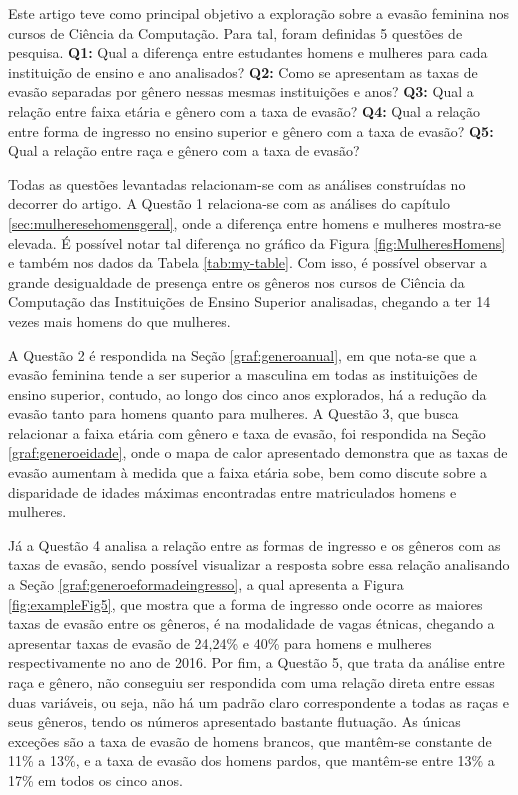 \documentclass[a4paper]{article}
\begin{document}
Este artigo teve como principal objetivo a exploração sobre a evasão feminina nos cursos de Ciência da Computação. Para tal, foram definidas 5 questões de pesquisa. \textbf{Q1:} Qual a diferença entre estudantes homens e mulheres para cada instituição de ensino e ano analisados? \textbf{Q2:} Como se apresentam as taxas de evasão separadas por gênero nessas mesmas instituições e anos? \textbf{Q3:} Qual a relação entre faixa etária e gênero com a taxa de evasão? \textbf{Q4:} Qual a relação entre forma de ingresso no ensino superior e gênero com a taxa de evasão? \textbf{Q5:} Qual a relação entre raça e gênero com a taxa de evasão?

Todas as questões levantadas relacionam-se com as análises construídas no decorrer do artigo. A Questão 1 relaciona-se com as análises do capítulo \ref{sec:mulheresehomensgeral}, onde a diferença entre homens e mulheres mostra-se elevada. É possível notar tal diferença no gráfico da Figura \ref{fig:MulheresHomens} e também nos dados da Tabela \ref{tab:my-table}. Com isso, é possível observar a grande desigualdade de presença entre os gêneros nos cursos de Ciência da Computação das Instituições de Ensino Superior analisadas, chegando a ter 14 vezes mais homens do que mulheres.%


A Questão 2 é respondida na Seção \ref{graf:generoanual}, em que nota-se que a evasão feminina tende a ser superior a masculina em todas as instituições de ensino superior, contudo, ao longo dos cinco anos explorados, há a redução da evasão tanto para homens quanto para mulheres. A Questão 3, que busca relacionar a faixa etária com gênero e taxa de evasão, foi respondida na Seção \ref{graf:generoeidade}, onde o mapa de calor apresentado demonstra que as taxas de evasão aumentam à medida que a faixa etária sobe, bem como discute sobre a disparidade de idades máximas encontradas entre matriculados homens e mulheres.

Já a Questão 4 analisa a relação entre as formas de ingresso e os gêneros com as taxas de evasão, sendo possível visualizar a resposta sobre essa relação analisando a Seção \ref{graf:generoeformadeingresso}, a qual apresenta a Figura \ref{fig:exampleFig5}, que mostra que a forma de ingresso onde ocorre as maiores taxas de evasão entre os gêneros, é na modalidade de vagas étnicas, chegando a apresentar taxas de evasão de 24,24\% e 40\% para homens e mulheres respectivamente no ano de 2016. Por fim, a Questão 5, que trata da análise entre raça e gênero, não conseguiu ser respondida com uma relação direta entre essas duas variáveis, ou seja, não há um padrão claro correspondente a todas as raças e seus gêneros, tendo os números apresentado bastante flutuação. As únicas exceções são a taxa de evasão de homens brancos, que mantêm-se constante de 11\% a 13\%, e a taxa de evasão dos homens pardos, que mantêm-se entre 13\% a 17\% em todos os cinco anos.
\end{document}
